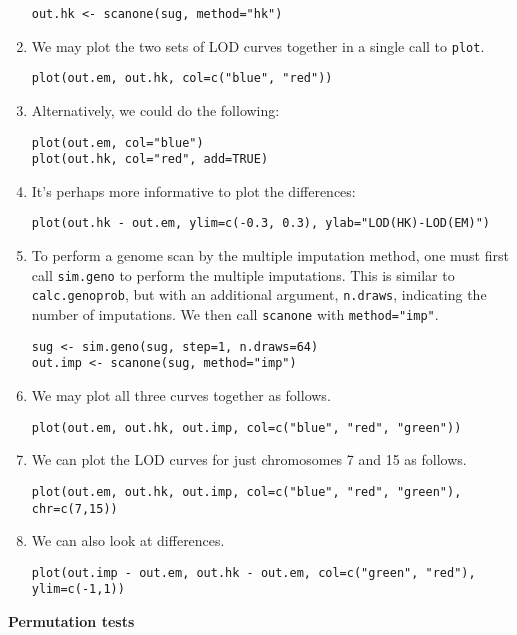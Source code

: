 \documentclass[10pt,letterpaper]{article}
\newcommand{\usercolor}{\color [named]{BlueViolet}}
\begin{document}
\begin{enumerate}
\usercolor
\verb|out.hk <- scanone(sug, method="hk")|
\normalcolor

\item We may plot the two sets of LOD curves together in a single call
  to \verb-plot-.

\usercolor
\verb|plot(out.em, out.hk, col=c("blue", "red"))|
\normalcolor

\item Alternatively, we could do the following:

\usercolor
\verb|plot(out.em, col="blue")| \\
\verb|plot(out.hk, col="red", add=TRUE)| 
\normalcolor

\item It's perhaps more informative to plot the differences:

\usercolor
\verb|plot(out.hk - out.em, ylim=c(-0.3, 0.3), ylab="LOD(HK)-LOD(EM)")|
\normalcolor
 
\item To perform a genome scan by the multiple imputation method, one
  must first call \verb-sim.geno- to perform the multiple
  imputations.  This is similar to \verb-calc.genoprob-, but with an
  additional argument, \verb-n.draws-, indicating the number of
  imputations.  We then call \verb-scanone- with \verb-method="imp"-.

\usercolor
\verb|sug <- sim.geno(sug, step=1, n.draws=64)| \\
\verb|out.imp <- scanone(sug, method="imp")|
\normalcolor

\item We may plot all three curves together as follows.

\usercolor
\verb|plot(out.em, out.hk, out.imp, col=c("blue", "red", "green"))|
\normalcolor

\item We can plot the LOD curves for just chromosomes 7 and 15 as follows.

\usercolor
\verb|plot(out.em, out.hk, out.imp, col=c("blue", "red", "green"), chr=c(7,15))|
\normalcolor

\item We can also look at differences.

\usercolor
\verb|plot(out.imp - out.em, out.hk - out.em, col=c("green", "red"), ylim=c(-1,1))|
\normalcolor

\end{enumerate}


\vspace{12pt}
\textbf{Permutation tests} \vspace{6pt}
\nopagebreak
\end{document}
